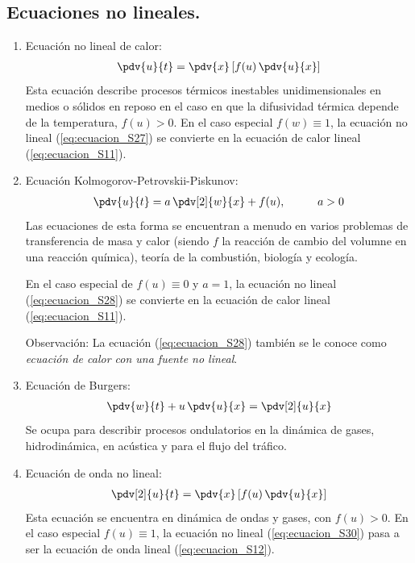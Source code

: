 \subsection{Ecuaciones no lineales.}
\begin{enumerate}
\item Ecuación no lineal de calor:
\begin{align}
\pdv{u}{t} = \pdv{x} \left[ f(u) \, \pdv{u}{x} \right]
\label{eq:ecuacion_S27}  
\end{align}
Esta ecuación describe procesos térmicos inestables unidimensionales en medios o sólidos en reposo en el caso en que la difusividad térmica depende de la temperatura, $f (u)> 0$. En el caso especial $f (w) \equiv 1$, la ecuación no lineal (\ref{eq:ecuacion_S27}) se convierte en la ecuación de calor lineal (\ref{eq:ecuacion_S11}).
\item Ecuación Kolmogorov-Petrovskii-Piskunov:
\begin{align}
\pdv{u}{t} = a \, \pdv[2]{w}{x} + f(u), \hspace{1cm} a > 0
\label{eq:ecuacion_S28}
\end{align}
Las ecuaciones de esta forma se encuentran a menudo en varios problemas de transferencia de masa y calor (siendo $f$ la reacción de cambio del volumne en una reacción química), teoría de la combustión, biología y ecología.
\par
En el caso especial de $f (u) \equiv 0$ y $a = 1$, la ecuación no lineal (\ref{eq:ecuacion_S28}) se convierte en la ecuación de calor lineal (\ref{eq:ecuacion_S11}).
\par
Observación: La ecuación (\ref{eq:ecuacion_S28}) también se le conoce como \emph{ecuación de calor con una fuente no lineal}.
\item Ecuación de Burgers:
\begin{align}
\pdv{w}{t} + u \, \pdv{u}{x} = \pdv[2]{u}{x}
\label{eq:ecuacion_S29}
\end{align}
Se ocupa para describir procesos ondulatorios en la dinámica de gases, hidrodinámica, en acústica y para el flujo del tráfico.
\item Ecuación de onda no lineal:
\begin{align}
\pdv[2]{u}{t} = \pdv{x} \left[ f(u) \, \pdv{u}{x} \right]
\label{eq:ecuacion_S30}
\end{align}
Esta ecuación se encuentra en dinámica de ondas y gases, con $f(u) > 0$. En el caso especial $f(u) \equiv 1$, la ecuación no lineal (\ref{eq:ecuacion_S30}) pasa a ser la ecuación de onda lineal (\ref{eq:ecuacion_S12}).

\end{enumerate}
